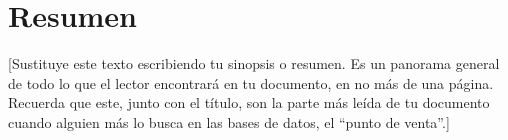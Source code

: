 \chapter*{Resumen}


[Sustituye este texto escribiendo tu sinopsis o resumen. Es un panorama general de todo lo que el lector encontrará en tu documento, en no más de una página. Recuerda que este, junto con el título, son la parte más leída de tu documento cuando alguien más lo busca en las bases de datos, el “punto de venta''.]


